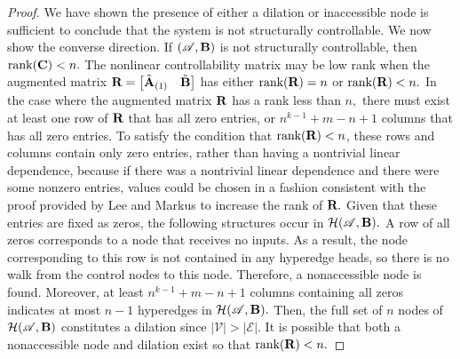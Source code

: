 \documentclass[journal,twoside,web]{ieeecolor}
\newcommand{\rank}{\text{rank}}
\newcommand{\Es}{\mathcal{E}}
\newcommand{\Hs}{\mathcal{H}}
\newcommand{\Vs}{\mathcal{V}}
\begin{document}
\begin{proof}
    
    We have shown the presence of either a dilation or inaccessible node is sufficient to conclude that the system is not structurally controllable. We now show the converse direction. If $(\mathscr A,\textbf B)$ is not structurally controllable, then $\rank(\textbf C) <n.$
    The nonlinear controllability matrix may be low rank when the augmented matrix $\textbf R=\begin{bmatrix}
        \tilde{\textbf A}_{(1)}&\tilde{\textbf B}
    \end{bmatrix}$ has either $\rank(\textbf R)=n$ or $\rank(\textbf R)<n.$
%
    In the case where the augmented matrix $\textbf R$ has a rank less than $n,$ there must exist at least one row of $\textbf R$ that has all zero entries, or $n^{k-1}+m-n+1$ columns that has all zero entries. To satisfy the condition that $\rank(\textbf R)<n$, these rows and columns contain only zero entries, rather than having a nontrivial linear dependence, because if there was a nontrivial linear dependence and there were some nonzero entries, values could be chosen in a fashion consistent with the proof provided by Lee and Markus to increase the rank of $\textbf R.$ Given that these entries are fixed as zeros, the following structures occur in $\Hs(\mathscr A,\textbf B).$ A row of all zeros corresponds to a node that receives no inputs. As a result, the node corresponding to this row is not contained in any hyperedge heads, so there is no walk from the control nodes to this node. Therefore, a nonaccessible node is found. Moreover, at least $n^{k-1}+m-n+1$ columns containing all zeros indicates at most $n-1$ hyperedges in $\Hs(\mathscr A,\textbf B).$ Then, the full set of $n$ nodes of $\Hs(\mathscr A,\textbf B)$ constitutes a dilation since $|\Vs|>|\Es|.$
    It is possible that both a nonaccessible node and dilation exist so that $\rank(\textbf R)<n.$


\end{proof}
\end{document}
